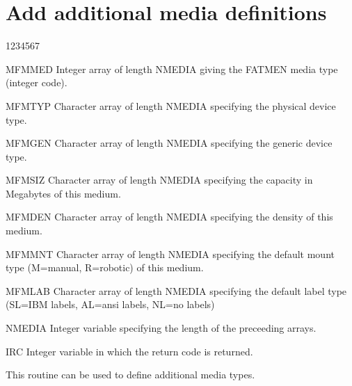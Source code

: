 \section{Add additional media definitions}
\begin{DLtt}{1234567}
\item[MFMMED]
Integer array of length NMEDIA giving the FATMEN media type
(integer code).
\item[MFMTYP]
Character array of length NMEDIA specifying the physical device
type.
\item[MFMGEN]
Character array of length NMEDIA specifying the generic device
type.
\item[MFMSIZ]
Character array of length NMEDIA specifying the capacity in
Megabytes of this medium.
\item[MFMDEN]
Character array of length NMEDIA specifying the density
of this medium.
\item[MFMMNT]
Character array of length NMEDIA specifying the default
mount type (M=manual, R=robotic)
of this medium.
\item[MFMLAB]
Character array of length NMEDIA specifying the default
label type (SL=IBM labels, AL=ansi labels, NL=no labels)
\item[NMEDIA]
Integer variable specifying the length of the preceeding
arrays.
\item[IRC]
Integer variable in which the return code is returned.
\end{DLtt}
\par
This routine can be used to define additional media types.
 
